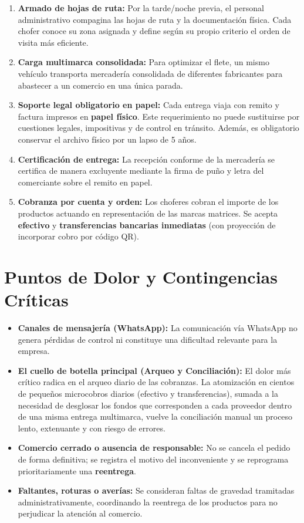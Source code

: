 \documentclass[11pt,a4paper]{article}
\begin{document}
\begin{enumerate}
  \item \textbf{Armado de hojas de ruta:} Por la tarde/noche previa, el personal administrativo compagina las hojas de ruta y la documentación física. Cada chofer conoce su zona asignada y define según su propio criterio el orden de visita más eficiente.
  \item \textbf{Carga multimarca consolidada:} Para optimizar el flete, un mismo vehículo transporta mercadería consolidada de diferentes fabricantes para abastecer a un comercio en una única parada.
  \item \textbf{Soporte legal obligatorio en papel:} Cada entrega viaja con remito y factura impresos en \textbf{papel físico}. Este requerimiento no puede sustituirse por cuestiones legales, impositivas y de control en tránsito. Además, es obligatorio conservar el archivo físico por un lapso de 5 años.
  \item \textbf{Certificación de entrega:} La recepción conforme de la mercadería se certifica de manera excluyente mediante la firma de puño y letra del comerciante sobre el remito en papel.
  \item \textbf{Cobranza por cuenta y orden:} Los choferes cobran el importe de los productos actuando en representación de las marcas matrices. Se acepta \textbf{efectivo} y \textbf{transferencias bancarias inmediatas} (con proyección de incorporar cobro por código QR).
\end{enumerate}

\section{Puntos de Dolor y Contingencias Críticas}

\begin{itemize}
  \item \textbf{Canales de mensajería (WhatsApp):} La comunicación vía WhatsApp no genera pérdidas de control ni constituye una dificultad relevante para la empresa.
  \item \textbf{El cuello de botella principal (Arqueo y Conciliación):} El dolor más crítico radica en el arqueo diario de las cobranzas. La atomización en cientos de pequeños microcobros diarios (efectivo y transferencias), sumada a la necesidad de desglosar los fondos que corresponden a cada proveedor dentro de una misma entrega multimarca, vuelve la conciliación manual un proceso lento, extenuante y con riesgo de errores.
  \item \textbf{Comercio cerrado o ausencia de responsable:} No se cancela el pedido de forma definitiva; se registra el motivo del inconveniente y se reprograma prioritariamente una \textbf{reentrega}.
  \item \textbf{Faltantes, roturas o averías:} Se consideran faltas de gravedad tramitadas administrativamente, coordinando la reentrega de los productos para no perjudicar la atención al comercio.
\end{itemize}
\end{document}
